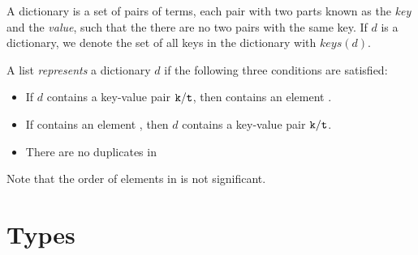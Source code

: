 \label{section:dictionaries}

\iftrue
A dictionary is a set of pairs of terms, each pair with two
parts known as the \emph{key} and the
\emph{value},
such that the there are no two pairs with the same key.
If $d$ is a dictionary, we denote the set of all keys in the dictionary
with $\mathit{keys}(d)$.

A list  \emph{represents} a dictionary $d$ if
the following
three conditions are satisfied:
\begin{itemize}
\item If $d$ contains a key-value pair ${\tt{\sl k}}/{\tt{\sl t}}$, then 
contains an element .
\item If  contains an element , then
$d$ contains a key-value pair ${\tt{\sl k}}/{\tt{\sl t}}$.
\item There are no duplicates in 
\end{itemize}
Note that the order of elements in  is not significant.
\else
A dictionary is a function from some domain of \emph{keys} to some
domain of \emph{values}.  We assume the following functions operating
on dictionaries:
\begin{itemize}
\item $\mathit{has\_key}(d,k)$ is \B{true} if the dictionary $d$ contains
a value for the key $k$.
\item $\mathit{value\_of}(d,k)$ is the value associated with the key $k$
in the dictionary $d$ if such a value exists, otherwise it is undefined.
\item $\mathit{without}(d,k)$ is a dictionary which is exactly like $d$
except that it contains no value for the key $k$.
\item $\mathit{update}(d,k,v)$ is a dictionary which is exactly like $d$
except that it contains the value $v$ for the key $k$.
\end{itemize}
We also assume that the constant $\mathit{empty\_dictionary}$ denotes an
empty dictionary.
\fi
{}
\fi

\section{Types}

\label{section:type-notation}

